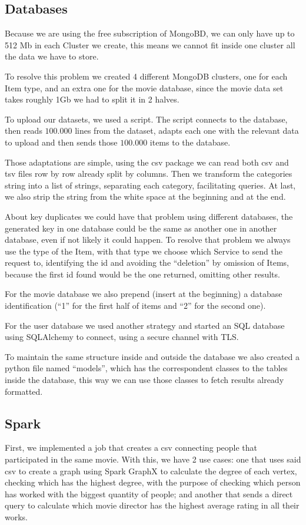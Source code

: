 \documentclass[oneside]{article}
\newcommand*\fpar{\hspace{1ex}}
\begin{document}
    \subsection{Databases}
    \fpar Because we are using the free subscription of MongoBD, we can only have up to 512 Mb in each Cluster we create, this means we cannot fit inside one cluster all the data we have to store.
    \par To resolve this problem we created 4 different MongoDB clusters, one for each Item type, and an extra one for the movie database, since the movie data set takes roughly 1Gb we had to split it in 2 halves.
    \par To upload our datasets, we used a script. The script connects to the database, then reads $100.000$ lines from the dataset, adapts each one with the relevant data to upload and then sends those $100.000$ items to the database. 
    \par Those adaptations are simple, using the csv package we can read both csv and tsv files row by row already split by columns. Then we transform the categories string into a list of strings, separating each category, facilitating queries. At last, we also strip the string from the white space at the beginning and at the end.
    \par About key duplicates we could have that problem using different databases, the generated key in one database could be the same as another one in another database, even if not likely it could happen. To resolve that problem we always use the type of the Item, with that type we choose which Service to send the request to, identifying the id and avoiding the “deletion” by omission of Items, because the first id found would be the one returned, omitting other results.
    \par For the movie database we also prepend (insert at the beginning) a database identification (“1” for the first half of items and “2” for the second one).
    \par For the user database we used another strategy and started an SQL database using SQLAlchemy to connect, using a secure channel with TLS.
    \par To maintain the same structure inside and outside the database we also created a python file named “models”, which has the correspondent classes to the tables inside the database, this way we can use those classes to fetch results already formatted. 

  \clearpage
  \subsection{Spark}
  \fpar First, we implemented a job that creates a csv connecting people that participated in the same movie. With this, we have 2 use cases: one that uses said csv to create a graph using Spark GraphX to calculate the degree of each vertex, checking which has the highest degree, with the purpose of checking which person has worked with the biggest quantity of people; and another that sends a direct query to calculate which movie director has the highest average rating in all their works.
\end{document}

